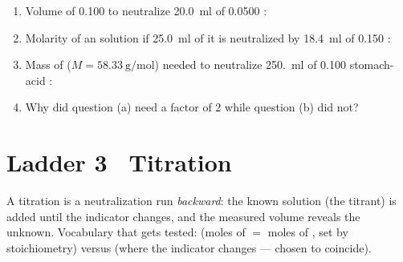 \documentclass{apchem-worksheet}
\begin{document}
\begin{yourturn}
\begin{enumerate}[leftmargin=*,itemsep=0.5em]
  \item Volume of \SI{0.100}{\Molar}  to neutralize
        \SI{20.0}{\milli\litre} of \SI{0.0500}{\Molar} :
        \workspace[1.8cm]
  \item Molarity of an  solution if \SI{25.0}{\milli\litre} of
        it is neutralized by \SI{18.4}{\milli\litre} of
        \SI{0.150}{\Molar} : \workspace[1.8cm]
  \item Mass of  ($M = \SI{58.33}{\gram\per\mole}$) needed to
        neutralize \SI{250.}{\milli\litre} of \SI{0.100}{\Molar}
        stomach-acid : \workspace[2cm]
  \item Why did question (a) need a factor of 2 while question (b) did
        not? \workspace[1.6cm]
\end{enumerate}
\end{yourturn}

\section*{\sffamily Ladder 3 \textbullet\ Titration}

A titration is a neutralization run \emph{backward}: the known solution
(the titrant) is added until the indicator changes, and the measured
volume reveals the unknown. Vocabulary that gets tested:
 (moles of  $=$ moles of , set by
stoichiometry) versus  (where the indicator changes ---
chosen to coincide).
\end{document}

